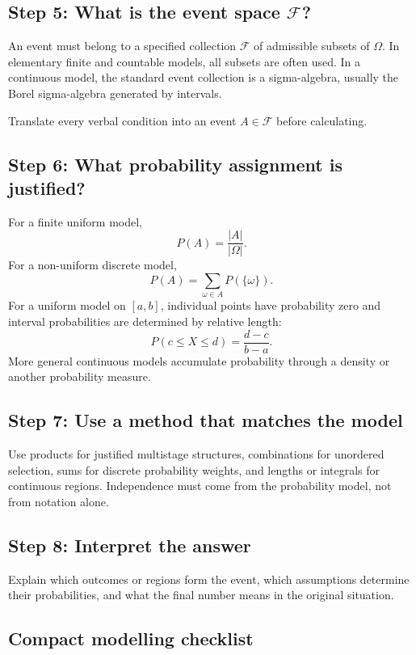 \subsection*{Step 5: What is the event space \(\mathcal F\)?}

An event must belong to a specified collection \(\mathcal F\) of admissible
subsets of \(\Omega\). In elementary finite and countable models, all subsets are
often used. In a continuous model, the standard event collection is a
sigma-algebra, usually the Borel sigma-algebra generated by intervals.

Translate every verbal condition into an event \(A\in\mathcal F\) before
calculating.

\subsection*{Step 6: What probability assignment is justified?}

For a finite uniform model,
\[
P(A)=\frac{|A|}{|\Omega|}.
\]
For a non-uniform discrete model,
\[
P(A)=\sum_{\omega\in A}P(\{\omega\}).
\]
For a uniform model on \([a,b]\), individual points have probability zero and
interval probabilities are determined by relative length:
\[
P(c\leq X\leq d)=\frac{d-c}{b-a}.
\]
More general continuous models accumulate probability through a density or
another probability measure.

\subsection*{Step 7: Use a method that matches the model}

Use products for justified multistage structures, combinations for unordered
selection, sums for discrete probability weights, and lengths or integrals for
continuous regions. Independence must come from the probability model, not from
notation alone.

\subsection*{Step 8: Interpret the answer}

Explain which outcomes or regions form the event, which assumptions determine
their probabilities, and what the final number means in the original situation.

\subsection*{Compact modelling checklist}

